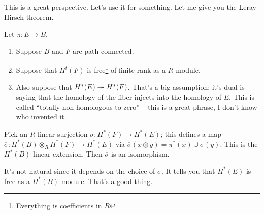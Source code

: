 This is a great perspective.
Let's use it for something.
Let me give you the Leray-Hirsch theorem.
\begin{theorem}
    Let $\pi:E\to B$.
    \begin{enumerate}
	\item Suppose $B$ and $F$ are path-connected.
	\item Suppose that $H^t(F)$ is free\footnote{Everything is coefficients in $R$} of finite rank as a $R$-module.
	\item Also suppose that $H^\ast(E)\twoheadrightarrow H^\ast(F)$.
    That's a big assumption; it's dual is saying that the homology of the fiber injects into the homology of $E$.
    This is called ``totally non-homologous to zero'' -- this is a great phrase, I don't know who invented it.
    \end{enumerate}
    Pick an $R$-linear surjection $\sigma:H^\ast(F)\to H^\ast(E)$; this defines a map $\overline{\sigma}:H^\ast(B)\otimes_R H^\ast(F)\to H^\ast(E)$ via $\overline{\sigma}(x\otimes y) = \pi^\ast(x)\cup \sigma(y)$.
    This is the $H^\ast(B)$-linear extension.
    Then $\overline{\sigma}$ is an isomorphism.
\end{theorem}
\begin{remark}
    It's not natural since it depends on the choice of $\sigma$.
    It tells you that $H^\ast(E)$ is free as a $H^\ast(B)$-module.
    That's a good thing.
\end{remark}

